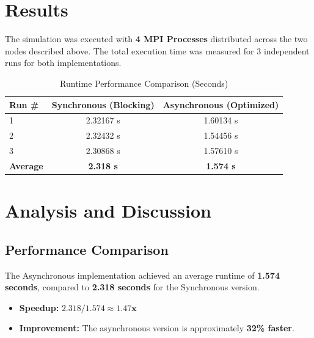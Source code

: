 \documentclass[12pt]{article}
\begin{document}
\section{Results}

The simulation was executed with \textbf{4 MPI Processes} distributed across the two nodes described above. The total execution time was measured for 3 independent runs for both implementations.

\begin{table}[H]
    \centering
    \caption{Runtime Performance Comparison (Seconds)}
    \begin{tabular}{lcc}
        \hline
        \textbf{Run \#} & \textbf{Synchronous (Blocking)} & \textbf{Asynchronous (Optimized)} \\
        \hline
        1 & 2.32167 s & 1.60134 s \\
        2 & 2.32432 s & 1.54456 s \\
        3 & 2.30868 s & 1.57610 s \\
        \hline
        \textbf{Average} & \textbf{2.318 s} & \textbf{1.574 s} \\
        \hline
    \end{tabular}
\end{table}

\section{Analysis and Discussion}

\subsection{Performance Comparison}
The Asynchronous implementation achieved an average runtime of \textbf{1.574 seconds}, compared to \textbf{2.318 seconds} for the Synchronous version.
\begin{itemize}
    \item \textbf{Speedup:} $2.318 / 1.574 \approx \mathbf{1.47x}$
    \item \textbf{Improvement:} The asynchronous version is approximately \textbf{32\% faster}.
\end{itemize}
\end{document}
